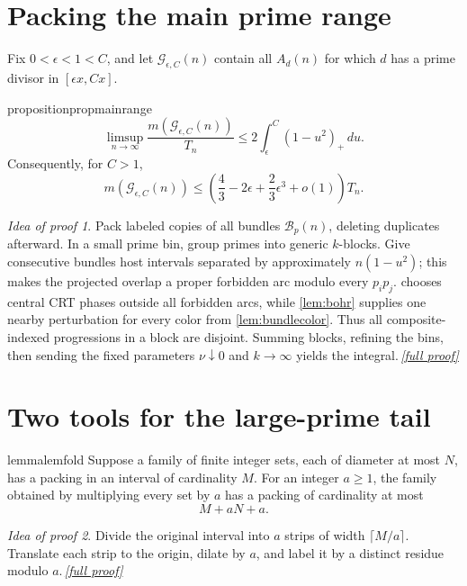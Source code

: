 \documentclass[11pt,a4paper]{article}
\theoremstyle{plain}
\theoremstyle{definition}
\theoremstyle{remark}
\newtheorem*{proofidea}{Idea of proof}
\newcommand{\fullproofref}[1]{\,\hyperref[#1]{\textit{[full proof]}}}
\newcommand{\cB}{\mathcal B}
\newcommand{\cG}{\mathcal G}
\begin{document}
\section{Packing the main prime range}\label{sec:mainrange}

Fix $0<\epsilon<1<C$, and let $\cG_{\epsilon,C}(n)$ contain all $A_d(n)$ for which $d$ has a prime divisor in $[\epsilon x,Cx]$.

\begin{restatable}{proposition}{propmainrange}\label{prop:mainrange}
\[
 \limsup_{n\to\infty}
 \frac{m(\cG_{\epsilon,C}(n))}{T_n}
 \le2\int_\epsilon^C(1-u^2)_+\,du.
\tag{6.1}
\]
Consequently, for $C>1$,
\[
 m(\cG_{\epsilon,C}(n))
 \le\left(\frac43-2\epsilon+\frac23\epsilon^3+o(1)\right)T_n.
\tag{6.2}\label{eq:main-range-explicit}
\]
\end{restatable}
\begin{proofidea}
Pack labeled copies of all bundles $\cB_p(n)$, deleting duplicates afterward. In a small prime bin, group primes into generic $k$-blocks. Give consecutive bundles host intervals separated by approximately $n(1-u^2)$; this makes the projected overlap a proper forbidden arc modulo every $p_ip_j$.  chooses central CRT phases outside all forbidden arcs, while \cref{lem:bohr} supplies one nearby perturbation for every color from \cref{lem:bundlecolor}. Thus all composite-indexed progressions in a block are disjoint. Summing blocks, refining the bins, then sending the fixed parameters $\nu\downarrow0$ and $k\to\infty$ yields the integral.\fullproofref{pf:mainrange}
\end{proofidea}

\section{Two tools for the large-prime tail}\label{sec:tail}

\begin{restatable}{lemma}{lemfold}\label{lem:fold}
Suppose a family of finite integer sets, each of diameter at most $N$, has a packing in an interval of cardinality $M$. For an integer $a\ge1$, the family obtained by multiplying every set by $a$ has a packing of cardinality at most
\[
 M+aN+a.
\tag{7.1}
\]
\end{restatable}
\begin{proofidea}
Divide the original interval into $a$ strips of width $\lceil M/a\rceil$. Translate each strip to the origin, dilate by $a$, and label it by a distinct residue modulo $a$.\fullproofref{pf:fold}
\end{proofidea}
\end{document}

